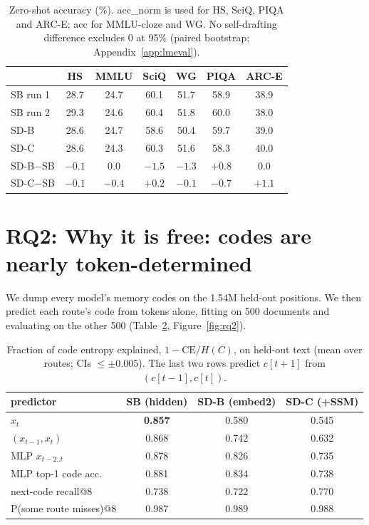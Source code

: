 \documentclass[11pt]{article}
\newcommand{\SB}{\textsc{SB}}
\newcommand{\SDB}{\textsc{SD-B}}
\newcommand{\SDC}{\textsc{SD-C}}
\begin{document}
\begin{table}[t]
\centering
\small
\setlength{\tabcolsep}{2.6pt}
\begin{tabular}{lcccccc}
\toprule
 & HS & MMLU & SciQ & WG & PIQA & ARC-E \\
\midrule
\SB{} run 1 & 28.7 & 24.7 & 60.1 & 51.7 & 58.9 & 38.9 \\
\SB{} run 2 & 29.3 & 24.6 & 60.4 & 51.8 & 60.0 & 38.0 \\
\SDB & 28.6 & 24.7 & 58.6 & 50.4 & 59.7 & 39.0 \\
\SDC & 28.6 & 24.3 & 60.3 & 51.6 & 58.3 & 40.0 \\
\midrule
\SDB$-$\SB & $-0.1$ & $0.0$ & $-1.5$ & $-1.3$ & $+0.8$ & $0.0$ \\
\SDC$-$\SB & $-0.1$ & $-0.4$ & $+0.2$ & $-0.1$ & $-0.7$ & $+1.1$ \\
\bottomrule
\end{tabular}
\caption{Zero-shot accuracy (\%). acc\_norm is used for HS, SciQ, PIQA and ARC-E; acc for MMLU-cloze and WG. No
self-drafting difference excludes 0 at 95\% (paired bootstrap; Appendix~\ref{app:lmeval}).}
\label{tab:lmeval}
\end{table}

\section{RQ2: Why it is free: codes are nearly token-determined}
\label{sec:why}

We dump every model's memory codes on the 1.54M held-out positions. We then predict each route's code from tokens alone,
fitting on 500 documents and evaluating on the other 500 (Table~\ref{tab:rq2}, Figure~\ref{fig:rq2}).

\begin{table}[t]
\centering
\small
\setlength{\tabcolsep}{3pt}
\begin{tabular}{lccc}
\toprule
predictor & \SB{} (hidden) & \SDB{} (embed2) & \SDC{} (+SSM) \\
\midrule
$x_t$ & \textbf{0.857} & 0.580 & 0.545 \\
$(x_{t-1},x_t)$ & 0.868 & 0.742 & 0.632 \\
MLP $x_{t-2..t}$ & 0.878 & 0.826 & 0.735 \\
\midrule
MLP top-1 code acc. & 0.881 & 0.834 & 0.738 \\
next-code recall@8 & 0.738 & 0.722 & 0.770 \\
P(some route misses)@8 & 0.987 & 0.989 & 0.988 \\
\bottomrule
\end{tabular}
\caption{Fraction of code entropy explained, $1-\mathrm{CE}/H(C)$, on held-out text (mean over routes; CIs
$\le\pm0.005$). The last two rows predict $c[t{+}1]$ from $(c[t-1],c[t])$.}
\label{tab:rq2}
\end{table}
\end{document}
